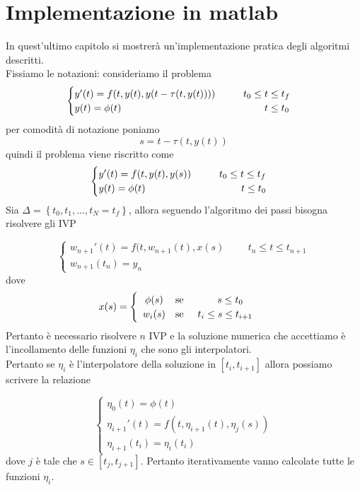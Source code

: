 \chapter{Implementazione in matlab}
In quest'ultimo capitolo si mostrerà un'implementazione pratica degli algoritmi descritti.\\[0.5cm]
Fissiamo le notazioni: consideriamo il problema
$$
\begin{cases}
 y'(t)=f(t,y(t),y(t-\tau(t,y(t))))		\hspace{1cm}	t_0 \le t \le t_f	\\
 y(t)=\phi(t)					\hspace{5.1cm}	t \le t_0
\end{cases}
$$
per comodità di notazione poniamo
$$
s=t-\tau(t,y(t))
$$
quindi il problema viene riscritto come
$$
\begin{cases}
 y'(t)=f(t,y(t),y(s))			\hspace{1cm}	t_0 \le t \le t_f	\\
 y(t)=\phi(t)				\hspace{3.4cm}	t \le t_0
\end{cases}
$$
Sia $\Delta= \left \{ t_0, t_1, \dots, t_N=t_f \right \}$, allora seguendo l'algoritmo dei passi bisogna risolvere gli IVP

\begin{equation}
 \begin{cases}
 w_{n+1}'(t)	=	f(t,w_{n+1}(t),x(s)		\hspace{1cm}	t_n \le t \le t_{n+1}		\\
 w_{n+1}(t_n) 	=	 y_n
\end{cases}
\end{equation}
dove
$$
x(s)=
\begin{cases}
\begin{array}{c lc}
 \phi(s)		&	\mbox{se}	\hspace{1.2cm}		s \le t_0			\\	
 w_i(s)			&	\mbox{se}	\hspace{0.5cm}		t_i \le s \le t_{i+1}		\\
\end{array}
\end{cases}
$$
Pertanto è necessario risolvere $n$ IVP e la soluzione numerica che accettiamo è l'incollamento delle funzioni $\eta_i$ che 
sono gli interpolatori.\\[0.3cm]
Pertanto se $\eta_i$ è l'interpolatore della soluzione in $[t_i , t_{i+1}]$ allora possiamo scrivere 
la relazione

$$
\begin{cases}
\eta_0(t)=\phi(t)						\\
\eta_{i+1}'(t)=f(t,\eta_{i+1}(t),\eta_j(s))			\\
\eta_{i+1}(t_i)=\eta_i(t_i)
\end{cases}
$$
dove $j$ è tale che $s \in [t_j , t_{j+1}]$. Pertanto iterativamente vanno calcolate tutte le funzioni $\eta_i$.\\

